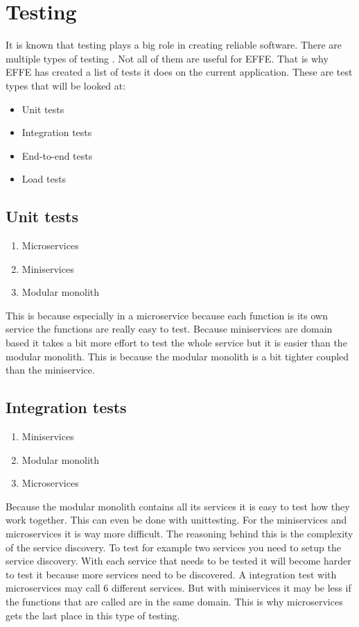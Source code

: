\section{Testing}
\label{sec:Testing}

It is known that testing plays a big role in creating reliable software. There are multiple types of testing \cite{testTypes}. Not all of them are useful for EFFE. That is why EFFE has created a list of tests it does on the current application. These are test types that will be looked at:

\begin{itemize}
        \item Unit tests
        \item Integration tests
        \item End-to-end tests
        \item Load tests
\end{itemize}

\subsection{Unit tests}
\label{sec:UnitTests}

\begin{enumerate}
        \item Microservices
        \item Miniservices
        \item Modular monolith
\end{enumerate}

This is because especially in a microservice because each function is its own service the functions are really easy to test. Because miniservices are domain based it takes a bit more effort to test the whole service but it is easier than the modular monolith. This is because the modular monolith is a bit tighter coupled than the miniservice.

\subsection{Integration tests}

\begin{enumerate}
        \item Miniservices
        \item Modular monolith
        \item Microservices
\end{enumerate}

Because the modular monolith contains all its services it is easy to test how they work together. This can even be done with unittesting. For the miniservices and microservices it is way more difficult. The reasoning behind this is the complexity of the service discovery. To test for example two services you need to setup the service discovery. With each service that needs to be tested it will become harder to test it because more services need to be discovered. A integration test with microservices may call 6 different services. But with miniservices it may be less if the functions that are called are in the same domain. This is why microservices gets the last place in this type of testing.

